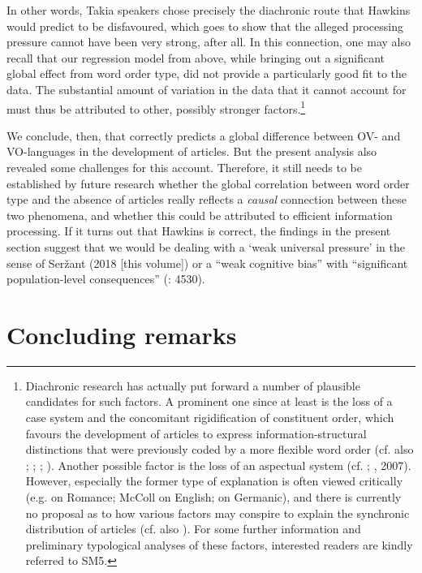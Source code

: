 \documentclass[output=paper]{langsci/langscibook}
\begin{document}
In other words, Takia speakers chose precisely the diachronic route that Hawkins would predict to be disfavoured, which goes to show that the alleged processing pressure cannot have been very strong, after all. In this connection, one may also recall that our regression model from above, while bringing out a significant global effect from word order type, did not provide a particularly good fit to the data. The substantial amount of variation in the data that it cannot account for must thus be attributed to other, possibly stronger factors.\footnote{Diachronic research has actually put forward a number of plausible candidates for such factors. A prominent one since at least \citet{Vennemann1975} is the loss of a case system and the concomitant rigidification of constituent order, which favours the development of articles to express information-structural distinctions that were previously coded by a more flexible word order (cf. also \citealt{Hawkins2004}; \citealt{HewsonBubenik2006}; \citealt{Fischer2010}; \citealt{CarlierLamiroy2014}). Another possible factor is the loss of an aspectual system (cf. \citealt{Abraham1997}; \citealt{Leiss2000}, 2007). However, especially the former type of explanation is often viewed critically (e.g. \citealt{Selig1992} on Romance; McColl \citealt{Millar2000} on English; \citealt{Leiss2000} on Germanic), and there is currently no proposal as to how various factors may conspire to explain the synchronic distribution of articles (cf. also \citealt{Lüdtke1991}). For some further information and preliminary typological analyses of these factors, interested readers are kindly referred to SM5.}

We conclude, then, that \citet{Hawkins2014} correctly predicts a global difference between OV- and VO-languages in the development of articles. But the present analysis also revealed some challenges for this account. Therefore, it still needs to be established by future research whether the global correlation between word order type and the absence of articles really reflects a \textit{causal} connection between these two phenomena, and whether this could be attributed to efficient information processing. If it turns out that Hawkins is correct, the findings in the present section suggest that we would be dealing with a ‘weak universal pressure’ in the sense of Seržant (2018 [this volume]) or a “weak cognitive bias” with “significant population-level consequences” (\citealt{ThompsonEtAl2016}: 4530).

\section{ Concluding remarks} 
\end{document}
